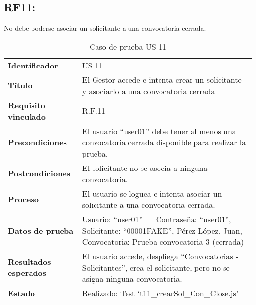 \subsection*{RF11:} No debe poderse asociar un solicitante a una convocatoria cerrada.
\begin{table}[H]
	\centering
	\small
	\caption{Caso de prueba US-11}
	\label{tab:caso_uso11}
	\begin{tabular}{>{\bfseries}l p{11cm}}
		Identificador & US-11 \\
		Título & El Gestor accede e intenta crear un solicitante y asociarlo a una convocatoria cerrada \\
		Requisito vinculado & R.F.11 \\
		Precondiciones & El usuario “user01” debe tener al menos una convocatoria cerrada disponible para realizar la prueba. \\
		Postcondiciones & El solicitante no se asocia a ninguna convocatoria. \\
		Proceso & El usuario se loguea e intenta asociar un solicitante a una convocatoria cerrada. \\
		Datos de prueba & Usuario: “user01” — Contraseña: “user01”, Solicitante: “00001FAKE”, Pérez López, Juan, Convocatoria: Prueba convocatoria 3 (cerrada) \\
		Resultados esperados & El usuario accede, despliega “Convocatorias - Solicitantes”, crea el solicitante, pero no se asigna ninguna convocatoria. \\
		Estado & Realizado: Test `t11\_crearSol\_Con\_Close.js' \\
	\end{tabular}
\end{table}


